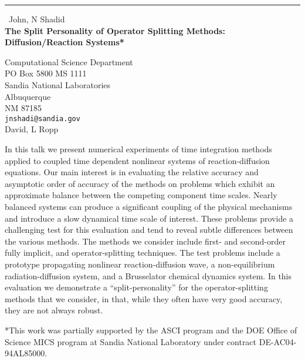 \documentclass{report}
\begin{document}
\begin{center}
\rule{6in}{1pt} \
{\large John, N Shadid \\
{\bf The Split Personality of Operator Splitting Methods: Diffusion/Reaction Systems*}}

Computational Science Department \\ PO Box 5800 MS 1111 \\ Sandia National Laboratories \\ Albuquerque \\ NM 87185
\\
{\tt jnshadi@sandia.gov}\\
David, L Ropp\end{center}

In this talk we present numerical experiments of time integration methods
applied to coupled time dependent nonlinear systems of reaction-diffusion
equations. Our main interest is in evaluating the relative accuracy and
asymptotic order of accuracy of the methods on problems which exhibit an
approximate balance between the competing component time scales. Nearly
balanced systems can produce a significant coupling of the physical
mechanisms and introduce a slow dynamical time scale of interest. These
problems provide a challenging test for this evaluation and tend to
reveal subtle differences between the various methods. The methods we
consider include first- and second-order fully implicit, and
operator-splitting techniques. The test problems include a prototype
propagating nonlinear reaction-diffusion wave, a non-equilibrium
radiation-diffusion system, and a Brusselator chemical dynamics system.
In this evaluation we demonstrate a ``split-personality'' for the
operator-splitting methods that we consider, in that, while they often
have very good accuracy, they are not always robust.


*This work was partially supported by the ASCI program and the DOE Office
of Science MICS program at Sandia National Laboratory under contract
DE-AC04-94AL85000.
\end{document}
